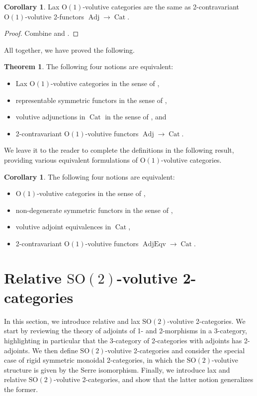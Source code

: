 \documentclass{article}
\newcommand{\Cat}{\operatorname{Cat}}%
\newcommand{\Adj}{\operatorname{Adj}}%
\newcommand{\AdjEqv}{\operatorname{AdjEqv}}%
\newcommand{\Oone}{\operatorname{O(1)}}
\newcommand{\Sotwo}{\operatorname{SO(2)}}
\numberwithin{equation}{section}
\theoremstyle{definition}
\newtheorem{corollary}[definition]{Corollary}
\theoremstyle{theorem}
\newtheorem{theorem}[definition]{Theorem}
\begin{document}
\begin{corollary}
    Lax $\Oone$-volutive categories are the same as 2-contravariant $\Oone$-volutive 2-functors $\Adj \to \Cat$. 
\end{corollary}
\begin{proof}
    Combine  and .
\end{proof}
All together, we have proved the following. 
\begin{theorem}\label{Theorem: four equivalent versions of lax O(1)-volutive categories}
    The following four notions are equivalent: 
    \begin{itemize}
        \item[(i)] Lax $\Oone$-volutive categories in the sense of ,
        \item[(ii)] representable symmetric functors in the sense of ,
        \item[(iii)] volutive adjunctions in $\Cat$ in the sense of , and
        \item[(iv)] 2-contravariant $\Oone$-volutive functors $\Adj \to \Cat$.
    \end{itemize}
\end{theorem}
We leave it to the reader to complete the definitions in the following result, providing various equivalent formulations of $\Oone$-volutive categories.
\begin{corollary}
    The following four notions are equivalent: 
    \begin{itemize}
        \item[(i)] $\Oone$-volutive categories in the sense of ,
        \item[(ii)] non-degenerate symmetric functors in the sense of ,
        \item[(iii)] volutive adjoint equivalences in $\Cat$,
        \item[(iv)] 2-contravariant $\Oone$-volutive functors $\AdjEqv \to \Cat$.
    \end{itemize}
\end{corollary}

\section{Relative $\Sotwo$-volutive 2-categories}\label{Section: Relative Sotwo volutive structures}
In this section, we introduce relative and lax $\Sotwo$-volutive 2-categories. We start by reviewing the theory of adjoints of 1- and 2-morphisms in a 3-category, 
highlighting in particular that the 3-category of 2-categories with adjoints has 2-adjoints. We then define $\Sotwo$-volutive 2-categories and consider the special 
case of rigid symmetric monoidal 2-categories, in which the $\Sotwo$-volutive structure is given by the Serre isomorphism. Finally, we introduce lax and 
relative $\Sotwo$-volutive 2-categories, and show that the latter notion generalizes the former. 
\end{document}
